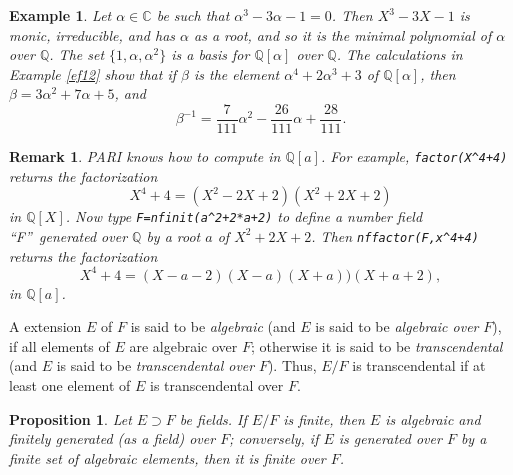\documentclass[a4paper,11pt,final,openany]{memoir}
\newtheorem{proposition}[X]{Proposition}
\newtheorem{example}[X]{Example}
\newtheorem{remark}[X]{Remark}
\theoremstyle{nonumberplain}
\begin{document}
\begin{example}
\label{ef17}Let $\alpha\in\mathbb{C}$ be such that $\alpha^{3}-3\alpha-1=0$.
Then $X^{3}-3X-1$ is monic, irreducible, and has $\alpha$ as a root, and so it
is the minimal polynomial of $\alpha$ over $\mathbb{Q}$. The set
$\{1,\alpha,\alpha^{2}\}$ is a basis for $\mathbb{Q}[\alpha]$ over
$\mathbb{Q}$. The calculations in Example \ref{ef12} show that if $\beta$ is
the element $\alpha^{4}+2\alpha^{3}+3$ of $\mathbb{Q}[\alpha]$, then
$\beta=3\alpha^{2}+7\alpha+5$, and
\[
\textstyle\beta^{-1}=\frac{7}{111}\alpha^{2}-\frac{26}{111}\alpha+\frac
{28}{111}.
\]

\end{example}

\begin{remark}
\label{ef18}PARI%
knows how to compute in $\mathbb{Q}[a]$. For example, \verb|factor(X^4+4)|
returns the factorization
\[
X^{4}+4=(X^{2}-2X+2)(X^{2}+2X+2)
\]
in $\mathbb{Q}[X]$. Now type \verb|F=nfinit(a^2+2*a+2)| to define a number
field \textquotedblleft F\textquotedblright\ generated over $\mathbb{Q}$ by a
root $a$ of $X^{2}+2X+2$. Then \verb|nffactor(F,x^4+4)| returns the
factorization
\[
X^{4}+4=(X-a-2)(X-a)(X+a))(X+a+2),
\]
in $\mathbb{Q}[a]$.
\end{remark}

A extension $E$ of $F$ is said to be \emph{algebraic\/}%
(and $E$ is said to be \emph{algebraic over }$F$), if all elements of $E$ are
algebraic over $F$; otherwise it is said to be \emph{transcendental\/}%
(and $E$ is said to be \emph{transcendental over} $F$). Thus, $E/F$ is
transcendental if at least one element of $E$ is transcendental over $F$.

\begin{proposition}
\label{ef19}Let $E\supset F$ be fields. If $E/F$ is finite, then $E$ is
algebraic and finitely generated (as a field) over $F$; conversely, if $E$ is
generated over $F$ by a finite set of algebraic elements, then it is finite
over $F$.
\end{proposition}
\end{document}
